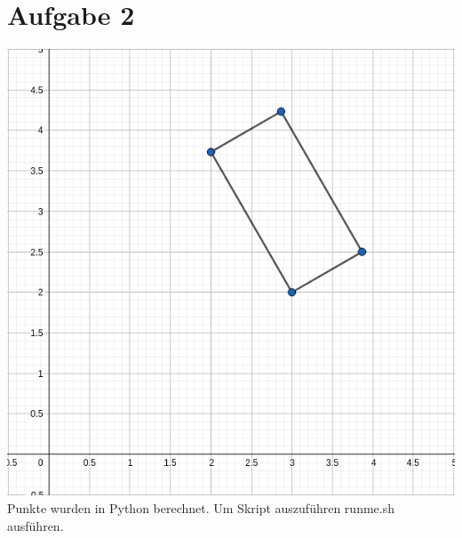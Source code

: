 \documentclass[11pt,a4paper,parskip=half ]{scrartcl}
\begin{document}
\section*{Aufgabe 2}
	\includegraphics[width=.75\textwidth]{Aufgabe2.png}
	\\
	Punkte wurden in Python berechnet. Um Skript auszuführen runme.sh ausführen.
\end{document}
